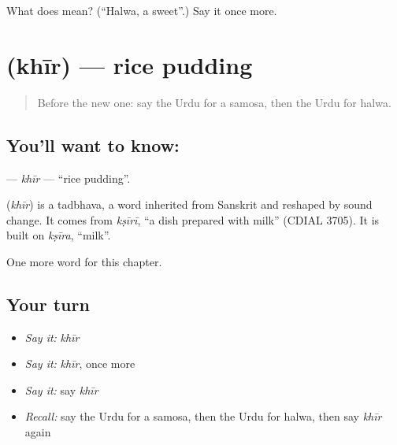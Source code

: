 \begin{tcolorbox}[breakable,colback=teal!4,colframe=teal!35!black,title={Before you move on}]
What does  mean? (\textquotedblleft{}Halwa, a sweet\textquotedblright{}.) Say it once more.
\end{tcolorbox}
\section[\texorpdfstring{\ur{کھیر} (khīr)}{کھیر (khīr)}]{ (khīr) — rice pudding}

\label{lesson:UR-C120-khir}



\begin{quote}
Before the new one: say the Urdu for a samosa, then the Urdu for halwa.
\end{quote}

\subsection*{You'll want to know: }
\textbf{} — \emph{khīr} — \textquotedblleft{}rice pudding\textquotedblright{}.

\begin{cousinweb}
\textbf{} (\emph{khīr}) is a tadbhava, a word inherited from Sanskrit and reshaped by sound change. It comes from \emph{kṣīrī}, \textquotedblleft{}a dish prepared with milk\textquotedblright{} (CDIAL 3705). It is built on \emph{kṣīra}, \textquotedblleft{}milk\textquotedblright{}.
\end{cousinweb}

\begin{grammarlens}[title={What you've built}]
One more word for this chapter.
\end{grammarlens}

\subsection*{Your turn}
\begin{itemize}
\raggedright
  \item \emph{Say it:} \emph{khīr}
  \item \emph{Say it:} \emph{khīr}, once more
  \item \emph{Say it:} say \emph{khīr}
  \item \emph{Recall:} say the Urdu for a samosa, then the Urdu for halwa, then say \emph{khīr} again
\end{itemize}

